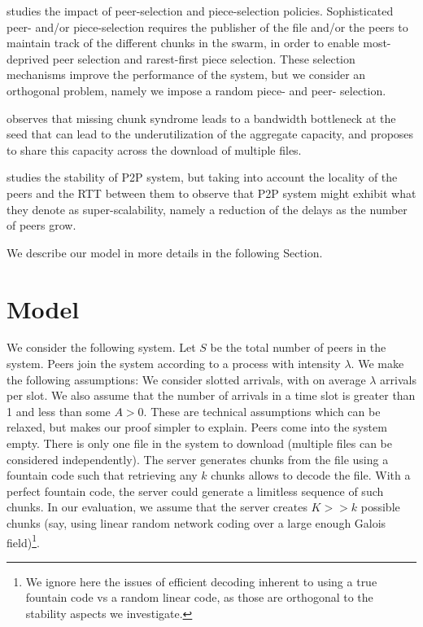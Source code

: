 \documentclass[11pt,conference]{IEEEtran}
\begin{document}
\cite{Menasche2011Implications} studies the impact of peer-selection and piece-selection policies. Sophisticated peer- and/or piece-selection requires the publisher of the file and/or the peers to maintain track of the different chunks in the swarm, in order to enable most-deprived peer selection and rarest-first piece selection. These selection mechanisms improve the performance of the system, but we consider an orthogonal problem, namely we impose a random piece- and peer- selection.

\cite{Zhou2011Stability} observes that missing chunk syndrome leads to a  bandwidth bottleneck at the seed that can lead to the underutilization of the aggregate capacity, and proposes to share this capacity across the download of multiple files.

\cite{baccelli2013p2p} studies the stability of P2P system, but taking into account the locality of the peers and the RTT between them to observe that P2P system might exhibit what they denote as super-scalability, namely a reduction of the delays as the number of peers grow.

We describe our model in more details in the following Section.


\section{Model}
\label{sec:model}

We consider the following system. Let $S$ be the total number of peers in the system. Peers join the system according to a process with intensity $\lambda$. We make the following assumptions: We consider slotted arrivals, with on average $\lambda$ arrivals per slot. We also assume that the number of arrivals in a time slot is greater than 1 and less than some $A>0$. These are technical assumptions which can be relaxed, but makes our proof simpler to explain. Peers come into the system empty. There is only one file in the system to download (multiple files can be considered independently). The server generates chunks from the file using a fountain code such that retrieving any $k$ chunks allows to decode the file. With a perfect fountain code, the server could generate a limitless sequence of such chunks. In our evaluation, we assume that the server creates $K>>k$ possible chunks (say, using linear random network coding over a large enough Galois field)\footnote{We ignore here the issues of efficient decoding inherent to using a true fountain code vs a random linear code, as those are orthogonal to the stability aspects we investigate.}.
\end{document}
